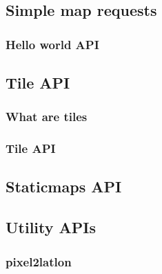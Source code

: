 \documentclass[17pt]{beamer}
\begin{document}
\subsection{Simple map requests}

\begin{frame}[fragile]
  \frametitle{Hello world API}
  \begin{block}{}
    \only<1>{
      
    }
    \only<2>{
      
    }
  \end{block}
\end{frame}

\subsection{Tile API}

\begin{frame}
  \frametitle{What are tiles}

\end{frame}

\begin{frame}[fragile]
  \frametitle{Tile API}
  \begin{block}{}
    \only<1>{
      
    }
    \only<2>{
      
    }
  \end{block}
\end{frame}

\subsection{Staticmaps API}

\subsection{Utility APIs}

\begin{frame}
  \frametitle{pixel2latlon}

\end{frame}
\end{document}
